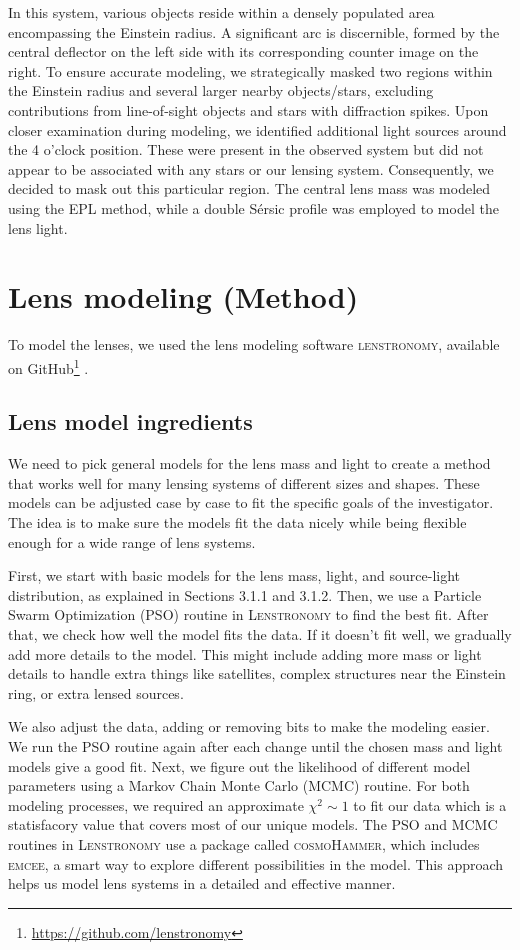 \documentclass{aa}
\begin{document}
In this system, various objects reside within a densely populated area encompassing the Einstein radius. A significant arc is discernible, formed by the central deflector on the left side with its corresponding counter image on the right. To ensure accurate modeling, we strategically masked two regions within the Einstein radius and several larger nearby objects/stars, excluding contributions from line-of-sight objects and stars with diffraction spikes. Upon closer examination during modeling, we identified additional light sources around the 4 o'clock position. These were present in the observed system but did not appear to be associated with any stars or our lensing system. Consequently, we decided to mask out this particular region. The central lens mass was modeled using the EPL method, while a double S\'ersic profile was employed to model the lens light.


\section{Lens modeling (Method)} \label{sec:modeling_method}

To model the lenses, we used the lens modeling software \textsc{lenstronomy}, available on GitHub\footnote{\url{https://github.com/lenstronomy}} \citep{Birrer15, Birrer18}.

\subsection{Lens model ingredients}
We need to pick general models for the lens mass and light to create a method that works well for many lensing systems of different sizes and shapes. These models can be adjusted case by case to fit the specific goals of the investigator. The idea is to make sure the models fit the data nicely while being flexible enough for a wide range of lens systems.

First, we start with basic models for the lens mass, light, and source-light distribution, as explained in Sections 3.1.1 and 3.1.2. Then, we use a Particle Swarm Optimization (PSO) routine in \textsc{Lenstronomy} to find the best fit. After that, we check how well the model fits the data. If it doesn't fit well, we gradually add more details to the model. This might include adding more mass or light details to handle extra things like satellites, complex structures near the Einstein ring, or extra lensed sources.

We also adjust the data, adding or removing bits to make the modeling easier. We run the PSO routine again after each change until the chosen mass and light models give a good fit. Next, we figure out the likelihood of different model parameters using a Markov Chain Monte Carlo (MCMC) routine. For both modeling processes, we required an approximate $\chi^2\sim 1$ to fit our data which is a statisfacory value that covers most of our unique models. The PSO and MCMC routines in \textsc{Lenstronomy} use a package called \textsc{cosmoHammer}, which includes \textsc{emcee}, a smart way to explore different possibilities in the model. This approach helps us model lens systems in a detailed and effective manner.
\end{document}
